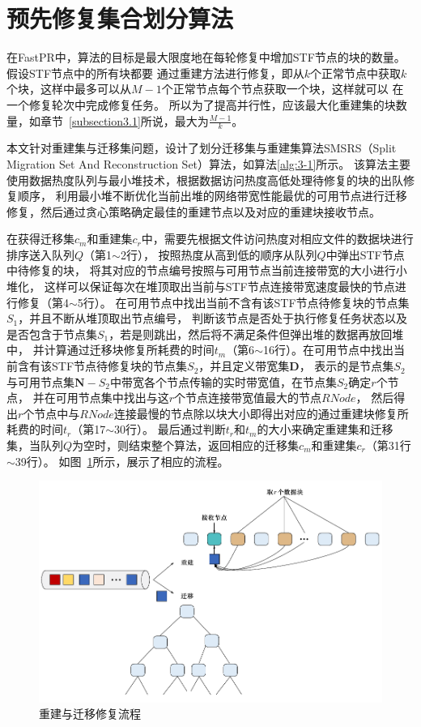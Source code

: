 \section{预先修复集合划分算法}
在FastPR\cite{shen2019fast}中，算法的目标是最大限度地在每轮修复中增加STF节点的块的数量。假设STF节点中的所有块都要
通过重建方法进行修复，即从$k$个正常节点中获取$k$个块，这样中最多可以从$M-1$个正常节点每个节点获取一个块，这样就可以
在一个修复轮次中完成修复任务。
所以为了提高并行性，应该最大化重建集的块数量，如章节~\ref{subsection3.1}所说，最大为$\frac{M-1}{k}$。

本文针对重建集与迁移集问题，设计了划分迁移集与重建集算法SMSRS（Split Migration Set And Reconstruction Set）算法，如算法\ref{alg:3-1}所示。
该算法主要使用数据热度队列与最小堆技术，根据数据访问热度高低处理待修复的块的出队修复顺序，
利用最小堆不断优化当前出堆的网络带宽性能最优的可用节点进行迁移修复，然后通过贪心策略确定最佳的重建节点以及对应的重建块接收节点。

在获得迁移集$c_m$和重建集$c_r$中，需要先根据文件访问热度对相应文件的数据块进行排序送入队列$Q$（第1$\sim$2行），
按照热度从高到低的顺序从队列$Q$中弹出STF节点中待修复的块，
将其对应的节点编号按照与可用节点当前连接带宽的大小进行小堆化，
这样可以保证每次在堆顶取出当前与STF节点连接带宽速度最快的节点进行修复（第4$\sim$5行）。
在可用节点中找出当前不含有该STF节点待修复块的节点集$S_1$，并且不断从堆顶取出节点编号，
判断该节点是否处于执行修复任务状态以及是否包含于节点集$S_1$，若是则跳出，然后将不满足条件但弹出堆的数据再放回堆中，
并计算通过迁移块修复所耗费的时间$t_m$（第6$\sim$16行）。在可用节点中找出当前含有该STF节点待修复块的节点集$S_2$，并且定义带宽集$\textbf{D}$，
表示的是节点集$S_2$与可用节点集$\textbf{N}-S_2$中带宽各个节点传输的实时带宽值，在节点集$S_2$确定$r$个节点，
并在可用节点集中找出与这$r$个节点连接带宽值最大的节点$RNode$，
然后得出$r$个节点中与$RNode$连接最慢的节点除以块大小即得出对应的通过重建块修复所耗费的时间$t_r$（第17$\sim$30行）。
最后通过判断$t_r$和$t_m$的大小来确定重建集和迁移集，当队列$Q$为空时，则结束整个算法，返回相应的迁移集$c_m$和重建集$c_r$（第31行$\sim$39行）。
如图~\ref{fig:3.3}所示，展示了相应的流程。


\begin{figure}[htbp]
	\centering
	\includegraphics [scale=0.7]{figures/3.3.pdf}
	\caption{重建与迁移修复流程}
	\label{fig:3.3}
\end{figure}


